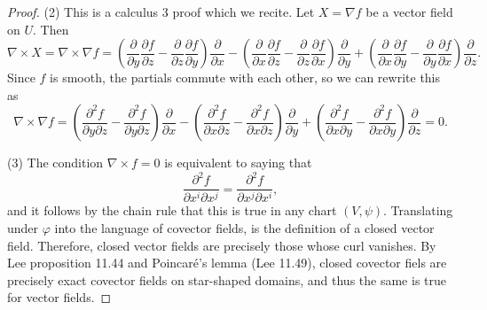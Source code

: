 \documentclass[11pt, letterpaper]{article}
\begin{document}
\begin{proof}
	(2) This is a calculus 3 proof which we recite. Let $X=\nabla f$ be a vector field on $U$. Then
	\[
		\nabla \times X = \nabla \times \nabla f=\left( \frac{\partial }{\partial y} \frac{\partial f}{\partial z} -\frac{\partial }{\partial z} \frac{\partial f}{\partial y}  \right) \frac{\partial }{\partial x} -\left( \frac{\partial }{\partial x} \frac{\partial f}{\partial z} -\frac{\partial }{\partial z} \frac{\partial f}{\partial x}  \right) \frac{\partial }{\partial y} + \left( \frac{\partial }{\partial x} \frac{\partial f}{\partial y} -\frac{\partial }{\partial y} \frac{\partial f}{\partial x}  \right) \frac{\partial }{\partial z} 
	.\]
	Since $f$ is smooth, the partials commute with each other,  so we can rewrite this as
	\[
		\nabla \times \nabla f = \left( \frac{\partial ^2f}{\partial y \partial z} -\frac{\partial ^2 f}{\partial y \partial z}  \right) \frac{\partial }{\partial x} -\left( \frac{\partial ^2f}{\partial x \partial z} -\frac{\partial ^2f}{\partial x \partial z}  \right) \frac{\partial }{\partial y} +\left( \frac{\partial ^2f}{\partial x \partial y} -\frac{\partial ^2 f}{\partial x \partial y}  \right) \frac{\partial }{\partial z} =0
	.\]
	
	(3) The condition $\nabla \times f = 0$ is equivalent to saying that
	\[
		\frac{\partial ^2 f}{\partial x^i \partial x^j} = \frac{\partial ^2 f}{\partial x^j \partial x^i} 
	,\]
	and it follows by the chain rule that this is true in any chart $(V,\psi )$. Translating under $\varphi $ into the language of covector fields, is the definition of a closed vector field. Therefore, closed vector fields are precisely those whose curl vanishes. By Lee proposition 11.44 and Poincar\'e's lemma (Lee 11.49), closed covector fiels are precisely exact covector fields on star-shaped domains, and thus the same is true for vector fields.

\end{proof}
\end{document}

